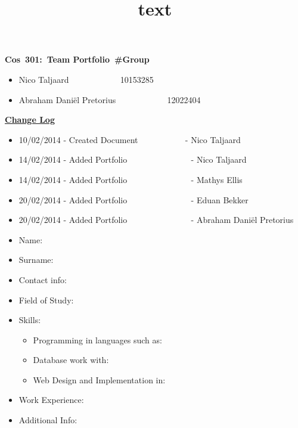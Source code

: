 \documentclass[12pt]{article}
\newcommand{\Title}{Team Portfolio\ \#Group } %
\newcommand{\Class}{Cos\ 301} %
\begin{document}
\title{text}
	\vspace{2in}
	\hspace{1.5in}
	\textmd{\textbf{\Class:\ \Title}}\\
	\vspace{1.5in}


\begin{itemize} %
	\item Nico Taljaard \ ~~~~~~~~~ \ 10153285
	\item Abraham Daniël Pretorius \ ~~~~~~~~~ \ 12022404
	
\end{itemize}

\newpage
\textbf{\underline{Change Log}}
\begin{itemize}
	\item 10/02/2014 - Created Document \ ~~~~~~~~ \ - Nico Taljaard
	\item 14/02/2014 - Added Portfolio \ ~~~~~~~~~~~~ \ - Nico Taljaard
	\item 14/02/2014 - Added Portfolio \ ~~~~~~~~~~~~ \ - Mathys Ellis
	\item 20/02/2014 - Added Portfolio \ ~~~~~~~~~~~~ \ - Eduan Bekker
	\item 20/02/2014 - Added Portfolio \ ~~~~~~~~~~~~ \ - Abraham Daniël Pretorius
\end{itemize}


\newpage %

\begin{itemize}
	\item Name: \ ~~~~~~~~~~~~~~~ \ 
	\item Surname: \ ~~~~~~~~~~~ \ 
	\item Contact info: \ ~~~~~~ \  
	\item Field of Study: \ ~~~~ \ 
	\item Skills: \begin{itemize}
					\item Programming in languages such as:
					\item Database work with: 
					\item Web Design and Implementation in:     %
				  \end{itemize}
	\item Work Experience: \  \ 
	\item Additional Info: \ ~~ \ 	
\end{itemize}
\end{document}
